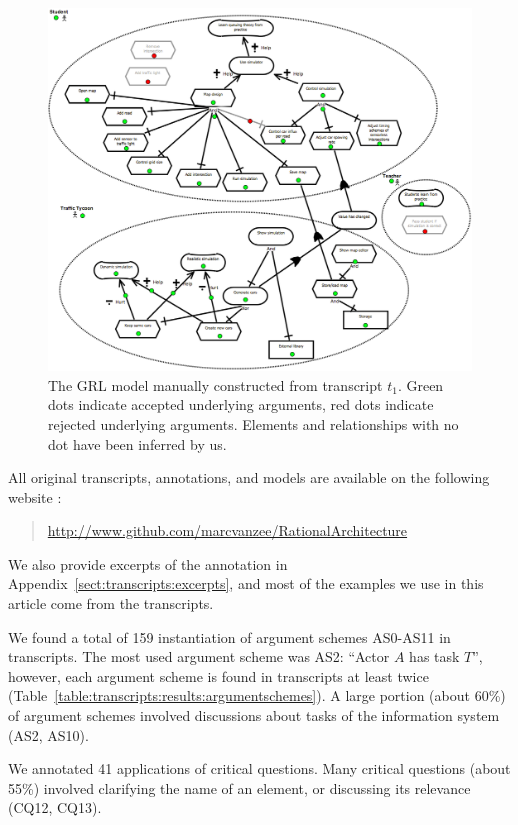 \begin{figure}[h]
\includegraphics[width=\textwidth]{img/transcript_grl}
\caption{The GRL model manually constructed from transcript $t_1$. Green dots indicate accepted underlying arguments, red dots indicate rejected underlying arguments. Elements and relationships with no dot have been inferred by us.}
\label{fig:transcripts:grl}
\end{figure} %

All original transcripts, annotations, and models are available on the following website :
\begin{quote} \url{http://www.github.com/marcvanzee/RationalArchitecture}
\end{quote}
We also provide excerpts of the annotation in Appendix~\ref{sect:transcripts:excerpts}, and most of the examples we use in this article come from the transcripts.

We found a total of 159 instantiation of argument schemes AS0-AS11 in transcripts. The most used argument scheme was AS2: ``Actor $A$ has task $T$'', however, each argument scheme is found in transcripts at least twice (Table~\ref{table:transcripts:results:argumentschemes}). A large portion (about 60\%) of argument schemes involved discussions about tasks of the information system (AS2, AS10).

We annotated 41 applications of critical questions. Many critical questions (about 55\%) involved clarifying the name of an element, or discussing its relevance (CQ12, CQ13).

